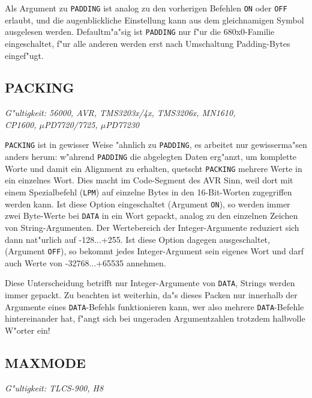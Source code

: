 \documentclass[12pt,a4paper,twoside]{report}
\makeatletter
\newcommand{\tty}[1]{{\tt #1}}
\newcommand{\ttindex}[1]{\index{#1@{\tt #1}}}
\makeatother
\begin{document}
Als Argument zu \tty{PADDING} ist analog zu den vorherigen Befehlen
\tty{ON} oder \tty{OFF} erlaubt, und die augenblickliche Einstellung
kann aus dem gleichnamigen Symbol ausgelesen werden. Defaultm"a"sig
ist \tty{PADDING} nur f"ur die 680x0-Familie eingeschaltet, f"ur alle
anderen werden erst nach Umschaltung Padding-Bytes eingef"ugt.


\subsection{PACKING}
\ttindex{PACKING}

{\em G"ultigkeit: 56000, AVR, TMS3203x/4x, TMS3206x, MN1610, \\
     CP1600, $\mu$PD7720/7725, $\mu$PD77230}

{\tt PACKING} ist in gewisser Weise "ahnlich zu {\tt PADDING}, es arbeitet
nur gewisserma"sen anders herum: w"ahrend {\tt PADDING} die
abgelegten Daten erg"anzt, um komplette Worte und damit ein Alignment zu
erhalten, quetscht {\tt PACKING} mehrere Werte in ein einzelnes Wort.
Dies macht im Code-Segment des AVR Sinn, weil dort mit einem Spezialbefehl
({\tt LPM}) auf einzelne Bytes in den 16-Bit-Worten zugegriffen werden
kann.  Ist diese Option eingeschaltet (Argument {\tt ON}), so werden immer
zwei Byte-Werte bei {\tt DATA} in ein Wort gepackt, analog zu den
einzelnen Zeichen von String-Argumenten.  Der Wertebereich der
Integer-Argumente reduziert sich dann nat"urlich auf -128...+255.  Ist
diese Option dagegen ausgeschaltet, (Argument {\tt OFF}), so bekommt
jedes Integer-Argument sein eigenes Wort und darf auch Werte von
-32768...+65535 annehmen.

Diese Unterscheidung betrifft nur Integer-Argumente von {\tt DATA},
Strings werden immer gepackt.  Zu beachten ist weiterhin, da"s dieses
Packen nur innerhalb der Argumente eines {\tt DATA}-Befehls funktionieren
kann, wer also mehrere {\tt DATA}-Befehle hintereinander hat, f"angt sich
bei ungeraden Argumentzahlen trotzdem halbvolle W"orter ein!


\subsection{MAXMODE}
\ttindex{MAXMODE}

{\em G"ultigkeit: TLCS-900, H8}
\end{document}
